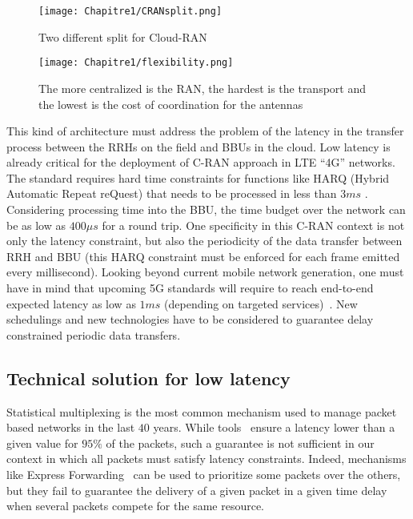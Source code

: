    \begin{figure}[h]
      \begin{center}
      \texttt{[image: Chapitre1/CRANsplit.png]}
      \end{center}
      \caption{Two different split for Cloud-RAN}\label{fig:CRANsplit}
      \end{figure}
      \begin{figure}[h]
      \begin{center}
      \texttt{[image: Chapitre1/flexibility.png]}
      \end{center}
      \caption{The more centralized is the RAN, the hardest is the transport and the lowest is the cost of coordination for the antennas}\label{fig:flexibility}
      \end{figure}
       
This kind of architecture must address the problem of the latency in the transfer process between the RRHs on the field and BBUs in the cloud. Low latency is already critical for the deployment of C-RAN approach in LTE “4G” networks. The standard requires hard time constraints for functions like HARQ (Hybrid Automatic Repeat reQuest) that needs to be processed in less than $3ms$ \cite{bouguen2012lte}. Considering processing time into the BBU, the time budget over the network can be as low as $400\mu s$ for a round trip. One specificity in this C-RAN context is not only the latency constraint, but also the periodicity of the data transfer between RRH and BBU (this HARQ constraint must be enforced for each frame emitted every millisecond). Looking beyond current mobile network generation, one must have in mind that upcoming 5G standards will require to reach end-to-end expected latency as low as $1ms$ (depending on targeted services)~\cite{boccardi2014five}. New schedulings and new technologies have to be considered to guarantee delay constrained periodic data transfers. 


\subsection{Technical solution for low latency}

Statistical multiplexing is the most common mechanism used to manage packet based networks in the last $40$ years. While tools~\cite{metricsietf} ensure a latency lower than a given value for $95\%$ of the packets, such a guarantee is not sufficient in our context in which all packets must satisfy latency constraints. Indeed, mechanisms like Express Forwarding~\cite{exprforw} can be used to prioritize some packets over the others, but they fail to guarantee the delivery of a given packet in a given time delay when several packets compete for the same resource. 


